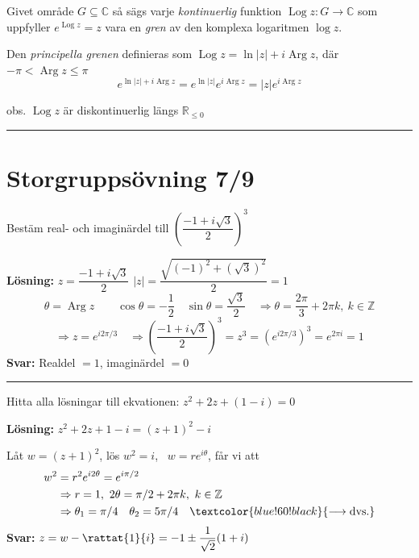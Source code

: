 \begin{definition}
Givet område $G \subseteq \mathbb{C}$ så sägs varje \emph{kontinuerlig} funktion $\operatorname{Log} z : G \to \mathbb{C}$ som uppfyller $e^{\operatorname{Log} z} = z$ vara en \emph{gren} av den komplexa logaritmen $\log z$.
\end{definition}

Den \emph{principella grenen} definieras som $\operatorname{Log} z = \ln|z| + i \operatorname{Arg} z$,
\hfill där $-\pi < \operatorname{Arg} z \le \pi$
\[ e^{\ln|z| + i\operatorname{Arg} z} = e^{\ln|z|} e^{i\operatorname{Arg} z} = |z| e^{i\operatorname{Arg} z} \]

\textcolor{red!70!black}{obs.} $\operatorname{Log} z$ är diskontinuerlig längs $\mathbb{R}_{\le 0}$

\noindent\rule{\linewidth}{0.4pt}

\section{Storgruppsövning 7/9}

 \quad Bestäm real- och imaginärdel till $\left( \dfrac{-1 + i\sqrt{3}}{2} \right)^3$

\textbf{Lösning:} $z = \dfrac{-1 + i\sqrt{3}}{2}$ \quad $|z| = \dfrac{\sqrt{(-1)^2 + (\sqrt{3})^2}}{2} = 1$
\[ \theta = \operatorname{Arg} z \qquad \cos\theta = -\frac{1}{2} \quad \sin\theta = \frac{\sqrt{3}}{2} \quad \Rightarrow \theta = \frac{2\pi}{3} + 2\pi k, \ k \in \mathbb{Z} \]
\[ \Rightarrow z = e^{i2\pi/3} \quad \Rightarrow \left( \frac{-1 + i\sqrt{3}}{2} \right)^3 = z^3 = \left(e^{i2\pi/3}\right)^3 = e^{2\pi i} = 1 \]
\textbf{Svar:} Realdel $= 1$, imaginärdel $= 0$

\noindent\rule{\linewidth}{0.4pt}

 \quad Hitta alla lösningar till ekvationen: $z^2 + 2z + (1 - i) = 0$

\textbf{Lösning:} $z^2 + 2z + 1 - i = (z + 1)^2 - i$

Låt $w = (z + 1)^2$, lös $w^2 = i$, \ $w = re^{i\theta}$, får vi att
\begin{align*}
  w^2 &= r^2 e^{i2\theta} = e^{i\pi/2} \\
  &\Rightarrow r = 1, \ 2\theta = \pi/2 + 2\pi k, \ k \in \mathbb{Z} \\
  &\Rightarrow \theta_1 = \pi/4 \quad \theta_2 = 5\pi/4 \quad \textcolor{blue!60!black}{\longrightarrow \text{dvs.}}
\end{align*}
\textbf{Svar:} $z = w - \rattat{1}{i} = -1 \pm \dfrac{1}{\sqrt{2}}(1 + i)$
